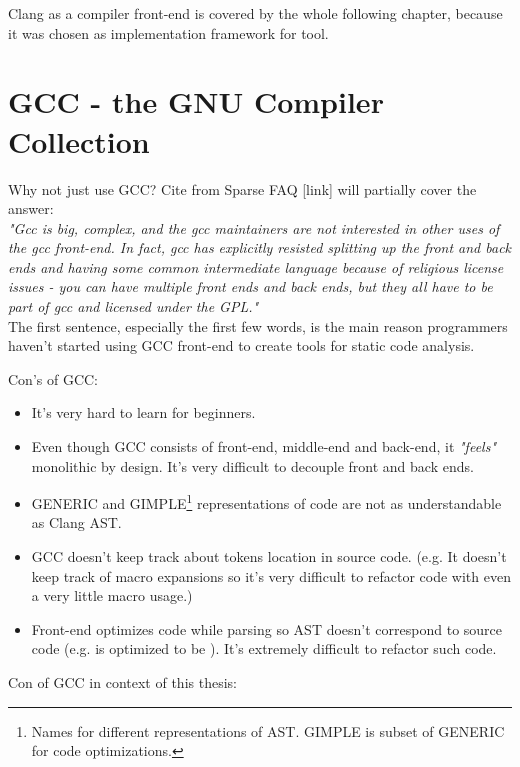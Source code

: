 Clang as a compiler front-end is covered by the whole following chapter, because it was chosen as implementation framework for tool. 

\section{GCC - the GNU Compiler Collection}
Why not just use GCC? Cite from Sparse FAQ [link] will partially cover the answer:\\

\emph{"Gcc is big, complex, and the gcc maintainers are not interested in other uses of the gcc front-end.  In fact, gcc has explicitly resisted splitting up the front and back ends and having some common intermediate language because of religious license issues - you can have multiple front ends and back ends, but they all have to be part of gcc and licensed under the GPL."}\\

The first sentence, especially the first few words, is the main reason programmers haven't started using GCC front-end to create tools for static code analysis.

Con's of GCC:

\begin{itemize}
\item It's very hard to learn for beginners.

\item Even though GCC consists of front-end, middle-end and back-end, it \textit{"feels"} monolithic by design. It's very difficult to decouple front and back ends.

\item GENERIC and GIMPLE\footnote{Names for different representations of AST. GIMPLE is subset of GENERIC for code optimizations.} representations of code are not as understandable as Clang AST.

\item GCC doesn't keep track about tokens location in source code. (e.g. It doesn't keep track of macro expansions so it's very difficult to refactor code with even a very little macro usage.)

\item Front-end optimizes code while parsing so AST doesn't correspond to source code (e.g.  is optimized to be ). It's extremely difficult to refactor such code.
\end{itemize}

Con of GCC in context of this thesis:

